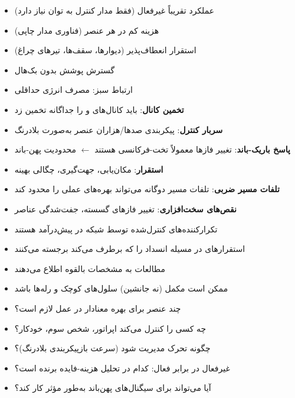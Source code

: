 
\begin{itemize}
\tightlist
\item
  عملکرد تقریباً غیرفعال (فقط مدار کنترل به توان نیاز دارد)
\item
  هزینه کم در هر عنصر (فناوری مدار چاپی)
\item
  استقرار انعطاف‌پذیر (دیوارها، سقف‌ها، تیرهای چراغ)
\item
  گسترش پوشش بدون بک‌هال
\item
  ارتباط سبز: مصرف انرژی حداقلی
\end{itemize}


\begin{itemize}
\tightlist
\item
  \textbf{تخمین کانال}: باید کانال‌های  و  را جداگانه تخمین زد
\item
  \textbf{سربار کنترل}: پیکربندی صدها/\allowbreak{}هزاران عنصر به‌صورت بلادرنگ
\item
  \textbf{پاسخ باریک-باند}: تغییر فازها معمولاً تخت-فرکانسی هستند \ensuremath{\leftarrow} محدودیت پهن-باند
\item
  \textbf{استقرار}: مکان‌یابی، جهت‌گیری، چگالی بهینه
\item
  \textbf{تلفات مسیر ضربی}: تلفات مسیر دوگانه می‌تواند بهره‌های عملی را محدود کند
\item
  \textbf{نقص‌های سخت‌افزاری}: تغییر فازهای گسسته، جفت‌شدگی عناصر
\end{itemize}


\begin{itemize}
\tightlist
\item
  تکرارکننده‌های کنترل‌شده توسط شبکه در  پیش‌درآمد هستند
\item
  استقرارهای  در  مسیله انسداد را که  برطرف می‌کند برجسته می‌کنند
\item
  مطالعات  به مشخصات بالقوه  اطلاع می‌دهند
\item
  ممکن است مکمل (نه جانشین) سلول‌های کوچک و رله‌ها باشد
\end{itemize}


\begin{itemize}
\tightlist
\item
  چند عنصر برای بهره معنادار در عمل لازم است؟
\item
  چه کسی  را کنترل می‌کند  اپراتور، شخص سوم، خودکار؟
\item
  چگونه تحرک مدیریت شود (سرعت بازپیکربندی بلادرنگ)؟
\item
  غیرفعال در برابر فعال: کدام در تحلیل هزینه-فایده برنده است؟
\item
  آیا  می‌تواند برای سیگنال‌های پهن‌باند به‌طور مؤثر کار کند؟
\end{itemize}

